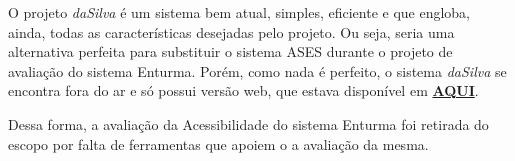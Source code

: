 	O projeto \textit{daSilva} é um sistema bem atual, simples, eficiente e que engloba, ainda, todas as características desejadas pelo projeto. Ou seja, seria uma alternativa perfeita para substituir o sistema ASES durante o projeto de avaliação do sistema Enturma. Porém, como nada é perfeito, o sistema \textit{daSilva} se encontra fora do ar e só possui versão web, que estava disponível em \href{http://www.dasilva.org.br/}{\textbf{AQUI}}. 

	Dessa forma, a avaliação da Acessibilidade do sistema Enturma foi retirada do escopo por falta de ferramentas que apoiem o a avaliação da mesma.
